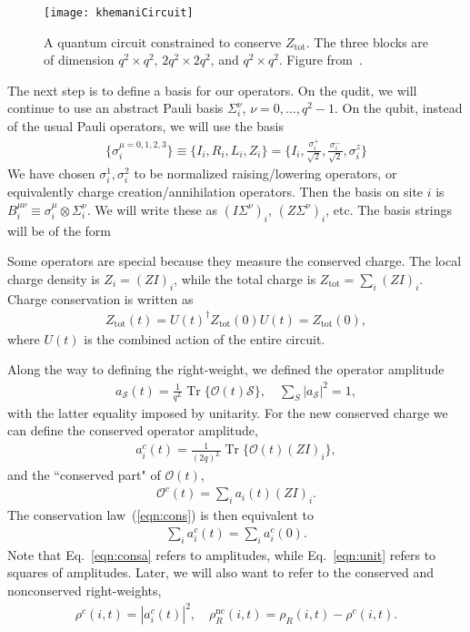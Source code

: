 \documentclass[a4paper,11pt]{article}
\renewcommand{\cal}{\mathcal}
\renewcommand{\th}[1]{\frac{1}{#1}}
\newcommand{\abs}[1]{\left| #1 \right|}
\renewcommand{\S}{\mathcal{S}}
\newcommand{\nc}{\text{nc}}
\newcommand{\tot}{\text{tot}}
\newcommand{\note}[1]{{\color{red}{#1}}}
\DeclareMathOperator{\Tr}{Tr}
\begin{document}
\begin{figure}
	\centering
	\texttt{[image: khemaniCircuit]}
	\caption{A quantum circuit constrained to conserve $Z_\tot$. The three blocks are of dimension $q^2\times q^2$, $2q^2\times 2q^2$, and $q^2\times q^2$. Figure from~\cite{KhemaniOpSp}.}
	\label{fig:khemaniCircuit}
\end{figure}

The next step is to define a basis for our operators. On the qudit, we will continue to use an abstract Pauli basis $\Sigma_i^\nu$, $\nu=0,\dots,q^2-1$. On the qubit, instead of the usual Pauli operators, we will use the basis~\cite{KhemaniOpSp}
\begin{align}
\{\sigma_i^{\mu=0,1,2,3}\} \equiv \{I_i, R_i, L_i,Z_i\}=\{I_i,\frac{\sigma_i^+}{\sqrt{2}}, \frac{\sigma_i^-}{\sqrt{2}}, \sigma_i^z\}
\end{align}
We have chosen $\sigma_i^1, \sigma_i^2$ to be normalized raising/lowering operators, or equivalently charge creation/annihilation operators. Then the basis on site $i$ is $B_i^{\mu\nu} \equiv \sigma_i^\mu \otimes \Sigma_i^\nu$. We will write these as $(I\Sigma^\nu)_i$, $(Z\Sigma^\nu)_i$, etc. The basis strings will be of the form \note{$\S=\otimes_iB_i^{\mu_i\nu_i}$.}

Some operators are special because they measure the conserved charge. The local charge density is $Z_i=(ZI)_i$, while the total charge is $Z_\tot=\sum_i(ZI)_i$. Charge conservation is written as 
\begin{align}
Z_\tot(t) = U(t)^\dag Z_\tot(0)U(t) = Z_\tot(0), \label{eqn:cons}
\end{align}
where $U(t)$ is the combined action of the entire circuit.

Along the way to defining the right-weight, we defined the operator amplitude
\begin{align}
a_\S(t) = \th{q^L}\Tr\{ \cal{O}(t)\S \},\quad \sum_S\abs{a_\S}^2 = 1, \label{eqn:unit}
\end{align}
with the latter equality imposed by unitarity. For the new conserved charge we can define the conserved operator amplitude,
\begin{align}
a_i^c(t) = \th{(2q)^{L}}\Tr\{\cal{O}(t)(ZI)_i\},
\end{align}
and  the ``conserved part" of $\cal{O}(t)$,
\begin{align}
\cal{O}^c(t)=\sum_i a_i(t)(ZI)_i.
\end{align}
The conservation law~(\ref{eqn:cons}) is then equivalent to 
\begin{align}
\sum_i a_i^c(t)=\sum_i a_i^c(0). \label{eqn:consa}
\end{align}
Note that Eq.~\ref{eqn:consa} refers to amplitudes, while Eq.~\ref{eqn:unit} refers to squares of amplitudes. Later, we will also want to refer to the conserved and nonconserved right-weights, 
\begin{align}
\rho^c(i,t) = \abs{a^c_i(t)}^2, \quad \rho_R^\nc(i,t) = \rho_R(i,t)- 
	\rho^c(i,t).
\end{align}
\end{document}
